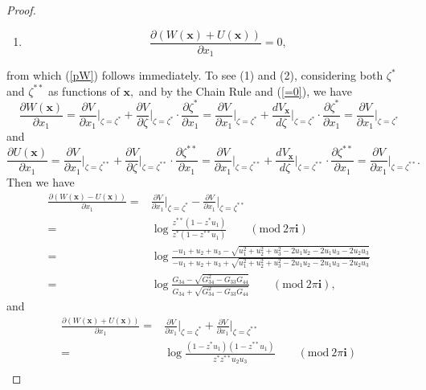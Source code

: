 \documentclass[11pt]{article}
\theoremstyle{remark}
\theoremstyle{remark}
\numberwithin{equation}{section}
\begin{document}
\begin{proof}
\begin{enumerate}[(1)]
    \item   $$\frac{\partial (W(\boldsymbol x)+U(\boldsymbol x))}{\partial x_1}=0,$$
\end{enumerate}
from which (\ref{pW}) follows immediately. To see (1) and (2), considering both $\zeta^*$ and $\zeta^{**}$ as functions of $\boldsymbol x,$ and by the Chain Rule and  (\ref{=0}), we have
$$\frac{\partial W(\boldsymbol x)}{\partial x_1}=\frac{\partial V}{\partial x_1}\bigg|_{\zeta=\zeta^*}+\frac{\partial V}{\partial \zeta}\bigg|_{\zeta=\zeta^*}\cdot\frac{\partial \zeta^*}{\partial x_1}=\frac{\partial V}{\partial x_1}\bigg|_{\zeta=\zeta^*}+\frac{d V_{\boldsymbol x}}{d \zeta}\bigg|_{\zeta=\zeta^*}\cdot\frac{\partial \zeta^*}{\partial x_1}=\frac{\partial V}{\partial x_1}\bigg|_{\zeta=\zeta^*}$$
and
$$\frac{\partial U(\boldsymbol x)}{\partial x_1}=\frac{\partial V}{\partial x_1}\bigg|_{\zeta=\zeta^{**}}+\frac{\partial V}{\partial \zeta}\bigg|_{\zeta=\zeta^{**}}\cdot \frac{\partial \zeta^{**}}{\partial x_1}=\frac{\partial V}{\partial x_1}\bigg|_{\zeta=\zeta^{**}}+\frac{d V_{\boldsymbol x}}{d \zeta}\bigg|_{\zeta=\zeta^{**}}\cdot\frac{\partial \zeta^{**}}{\partial x_1}=\frac{\partial V}{\partial x_1}\bigg|_{\zeta=\zeta^{**}}.$$
Then we have 
\begin{equation*}
\begin{split}
\frac{\partial (W(\boldsymbol x)-U(\boldsymbol x))}{\partial x_1} = & \frac{\partial V}{\partial x_1}\bigg|_{\zeta=\zeta^*}-\frac{\partial V}{\partial x_1}\bigg|_{\zeta=\zeta^{**}}\\ 
=& \log \frac{z^{**}(1-z^*u_1)}{z^*(1-z^{**}u_1)}\quad\quad (\mathrm{mod}\ 2\pi\mathbf i)\\
=& \log \frac{-u_1+u_2+u_3 - \sqrt{u_1^2+u_2^2+u_3^2-2u_1u_2-2u_1u_3-2u_2u_3}}{-u_1+u_2+u_3 +\sqrt{u_1^2+u_2^2+u_3^2-2u_1u_2-2u_1u_3-2u_2u_3}}\\
=&  \log\frac{G_{34}-\sqrt{G_{34}^2-G_{33}G_{44}}}{G_{34}+\sqrt{G_{34}^2-G_{33}G_{44}}} \quad\quad (\mathrm{mod}\ 2\pi\mathbf i),
\end{split}
\end{equation*}
and 
\begin{equation*}
\begin{split}
\frac{\partial (W(\boldsymbol x)+U(\boldsymbol x))}{\partial x_1} = & \frac{\partial V}{\partial x_1}\bigg|_{\zeta=\zeta^*}+\frac{\partial V}{\partial x_1}\bigg|_{\zeta=\zeta^{**}}\\ 
=& \log \frac{(1-z^*u_1)(1-z^{**}u_1)}{z^*z^{**}u_2u_3}\quad\quad (\mathrm{mod}\ 2\pi\mathbf i)\\

\end{split}
\end{equation*}
\end{proof}
\end{document}
